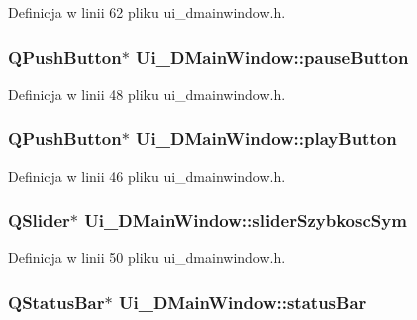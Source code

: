 Definicja w linii 62 pliku ui\-\_\-dmainwindow.\-h.

\hypertarget{class_ui___d_main_window_a70e142e35db4995a1fefa082406bdef3}{
\subsubsection[{pause\-Button}]{\setlength{\rightskip}{0pt plus 5cm}Q\-Push\-Button$\ast$ Ui\-\_\-\-D\-Main\-Window\-::pause\-Button}}\label{class_ui___d_main_window_a70e142e35db4995a1fefa082406bdef3}


Definicja w linii 48 pliku ui\-\_\-dmainwindow.\-h.

\hypertarget{class_ui___d_main_window_ad87cbf39ac14374923ed2a2b11e8b1bf}{
\subsubsection[{play\-Button}]{\setlength{\rightskip}{0pt plus 5cm}Q\-Push\-Button$\ast$ Ui\-\_\-\-D\-Main\-Window\-::play\-Button}}\label{class_ui___d_main_window_ad87cbf39ac14374923ed2a2b11e8b1bf}


Definicja w linii 46 pliku ui\-\_\-dmainwindow.\-h.

\hypertarget{class_ui___d_main_window_a8d12f07935a52a597e57eddf50e5c98f}{
\subsubsection[{slider\-Szybkosc\-Sym}]{\setlength{\rightskip}{0pt plus 5cm}Q\-Slider$\ast$ Ui\-\_\-\-D\-Main\-Window\-::slider\-Szybkosc\-Sym}}\label{class_ui___d_main_window_a8d12f07935a52a597e57eddf50e5c98f}


Definicja w linii 50 pliku ui\-\_\-dmainwindow.\-h.

\hypertarget{class_ui___d_main_window_ac9e025e7279839dd7ab1686456d1ae21}{
\subsubsection[{status\-Bar}]{\setlength{\rightskip}{0pt plus 5cm}Q\-Status\-Bar$\ast$ Ui\-\_\-\-D\-Main\-Window\-::status\-Bar}}\label{class_ui___d_main_window_ac9e025e7279839dd7ab1686456d1ae21}


